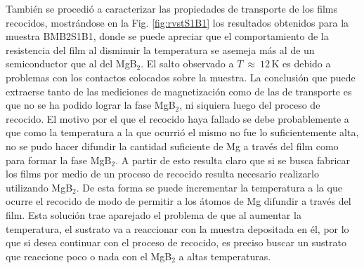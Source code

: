  También se procedió a caracterizar las propiedades de transporte de los films recocidos, mostrándose en la Fig. \ref{fig:rvstS1B1} los resultados obtenidos para la muestra BMB2S1B1, donde se puede apreciar que el comportamiento de la resistencia del film al disminuir la temperatura se asemeja más al de un semiconductor que al del MgB$_2$. El salto observado a $T \ \approx \  12$\,K es debido a problemas con los contactos colocados sobre la muestra. La conclusión que puede extraerse tanto de las mediciones de magnetización como de las de transporte es que no se ha podido lograr la fase MgB$_2$, ni siquiera luego del proceso de recocido. El motivo por el que el recocido haya fallado se debe probablemente a que como la temperatura a la que ocurrió el mismo no fue lo suficientemente alta, no se pudo hacer difundir la cantidad suficiente de Mg a través del film como para formar la fase MgB$_2$. A partir de esto resulta claro que si se busca fabricar los films por medio de un proceso de recocido resulta necesario realizarlo utilizando MgB$_2$. De esta forma se puede incrementar la temperatura a la que ocurre el recocido de modo de permitir a los átomos de Mg difundir a través del film. Esta solución trae aparejado el problema de que al aumentar la temperatura, el sustrato va a reaccionar con la muestra depositada en él, por lo que si desea continuar con el proceso de recocido, es preciso buscar un sustrato que reaccione poco o nada con el MgB$_2$ a altas temperaturas.
